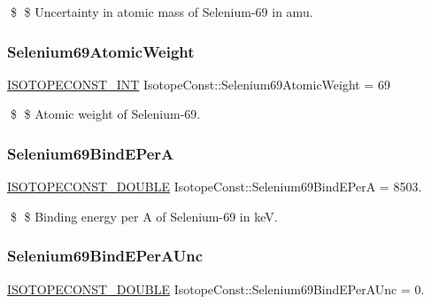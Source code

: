 \$ \$ Uncertainty in atomic mass of Selenium-\/69 in amu. \mbox{\label{group___isotope_const-_selenium-_se69_ga9c04b076b2b3d35232d0e342ff567fca}} 
\subsubsection{\texorpdfstring{Selenium69\+Atomic\+Weight}{Selenium69AtomicWeight}}
{\footnotesize\ttfamily \mbox{\hyperlink{group___isotope_const-_macros_ga5f18360b3e99483a35c32d789e62621c}{I\+S\+O\+T\+O\+P\+E\+C\+O\+N\+S\+T\+\_\+\+I\+NT}} Isotope\+Const\+::\+Selenium69\+Atomic\+Weight = 69}

\$ \$ Atomic weight of Selenium-\/69. \mbox{\label{group___isotope_const-_selenium-_se69_ga9e201c76a91f9d168fda5941dd324107}} 
\subsubsection{\texorpdfstring{Selenium69\+Bind\+E\+PerA}{Selenium69BindEPerA}}
{\footnotesize\ttfamily \mbox{\hyperlink{group___isotope_const-_macros_ga8f45a7272ce02c0b4c65c44636ed719a}{I\+S\+O\+T\+O\+P\+E\+C\+O\+N\+S\+T\+\_\+\+D\+O\+U\+B\+LE}} Isotope\+Const\+::\+Selenium69\+Bind\+E\+PerA = 8503.}

\$ \$ Binding energy per A of Selenium-\/69 in keV. \mbox{\label{group___isotope_const-_selenium-_se69_gadeefaf12969ccc8bba097f62fa41db48}} 
\subsubsection{\texorpdfstring{Selenium69\+Bind\+E\+Per\+A\+Unc}{Selenium69BindEPerAUnc}}
{\footnotesize\ttfamily \mbox{\hyperlink{group___isotope_const-_macros_ga8f45a7272ce02c0b4c65c44636ed719a}{I\+S\+O\+T\+O\+P\+E\+C\+O\+N\+S\+T\+\_\+\+D\+O\+U\+B\+LE}} Isotope\+Const\+::\+Selenium69\+Bind\+E\+Per\+A\+Unc = 0.}

